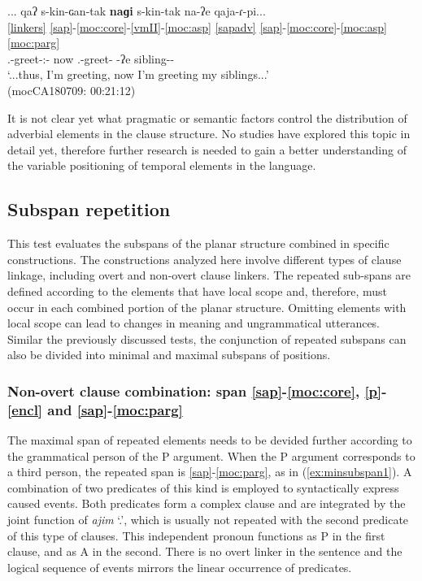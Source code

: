 \documentclass[output=paper]{langscibook}
\begin{document}
 
 \ea\label{ex:non-interruptadv}
 \glll ... qaʔ s-kin-ɢan-tak \textbf{naɡi} s-kin-tak na-ʔe qaja-ɾ-pi...\\
      {}  \ref{linkers} \ref{sap}-\ref{moc:core}-\ref{vmII}-\ref{moc:asp}  \ref{sapadv} \ref{sap}-\ref{moc:core}-\ref{moc:asp} \ref{moc:parg}\\
      {}  {\LinkOne} {\First.\II}-greet-{\Vm:\Intr}-{\Prog} now {\First.\II}-greet-{\Prog} {\DetThree}-ʔe sibling-{\Pl}-{\Coll}\\
 \glt `...thus, I'm greeting, now I'm greeting my siblings...' \\
  \glt \hfill (mocCA180709: 00:21:12)
 \z  
 
 It is not clear yet what pragmatic or semantic factors control the distribution of adverbial elements in the clause structure. No studies have explored this topic in detail yet, therefore further research is needed to gain a better understanding of the  variable positioning of temporal elements in the language.


\subsection{Subspan repetition}
\label{sec:subspan}
This test evaluates the subspans of the planar structure combined in specific constructions. The constructions analyzed here involve different types of clause linkage, including overt and non-overt clause linkers. The repeated sub-spans are defined according to the elements that have local scope and, therefore, must occur in each combined portion of the planar structure. Omitting elements with local scope can lead to changes in meaning and ungrammatical utterances. Similar the previously discussed tests, the conjunction of repeated subspans can also be divided into minimal and maximal subspans of positions.

\subsubsection{Non-overt clause combination: span \ref{sap}-\ref{moc:core}, \ref{p}-\ref{encl} and \ref{sap}-\ref{moc:parg}}
The maximal span of repeated elements needs to be devided further according to the grammatical person of the P argument. When the P argument corresponds to a third person, the repeated span is  \ref{sap}-\ref{moc:parg}, as in (\ref{ex:minsubspan1}). A combination of two predicates of this kind is employed to syntactically express caused events. Both predicates form a complex clause and are integrated by the joint function of \textit{ajim} `\First\Sg.\Pron', which is usually not repeated with the second predicate of this type of clauses. This independent pronoun functions as P in the first clause, and as A in the second. There is no overt linker in the sentence and the logical sequence of events mirrors the linear occurrence of predicates. 
\end{document}

